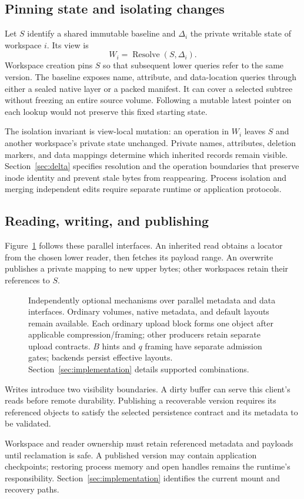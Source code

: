 \subsection{Pinning state and isolating changes}

Let $S$ identify a shared immutable baseline and $\Delta_i$ the private
writable state of workspace $i$. Its view is
\begin{equation}
  W_i = \operatorname{Resolve}(S,\Delta_i).
\end{equation}
Workspace creation pins $S$ so that subsequent lower queries refer to the
same version. The baseline exposes name, attribute, and data-location
queries through either a sealed native layer or a packed manifest.
It can cover a selected subtree without freezing an entire source volume.
Following a mutable latest pointer on each lookup would not preserve
this fixed starting state.

The isolation invariant is view-local mutation: an operation in $W_i$
leaves $S$ and another workspace's private state unchanged. Private names,
attributes, deletion markers, and data mappings determine which inherited
records remain visible. Section~\ref{sec:delta} specifies resolution and
the operation boundaries that preserve inode identity and prevent stale
bytes from reappearing. Process isolation and merging independent edits
require separate runtime or application protocols.

\subsection{Reading, writing, and publishing}

Figure~\ref{fig:overview} follows these parallel interfaces. An inherited
read obtains a locator from the chosen lower reader, then fetches its
payload range. An overwrite publishes a private mapping to new upper
bytes; other workspaces retain their references to $S$.

\begin{figure}[!t]
\centering

\caption{Independently optional mechanisms over parallel metadata and data
interfaces. Ordinary volumes, native metadata, and default layouts remain
available. Each ordinary upload block forms one object after applicable
compression/framing; other producers retain separate upload contracts.
$B$ hints and $q$ framing have separate admission gates; backends persist
effective layouts. Section~\ref{sec:implementation} details supported combinations.}
\label{fig:overview}
\end{figure}

Writes introduce two visibility boundaries. A dirty buffer can serve
this client's reads before remote durability. Publishing a recoverable
version requires its referenced objects to satisfy the selected
persistence contract and its metadata to be validated.

Workspace and reader ownership must retain referenced metadata and
payloads until reclamation is safe. A published version may contain
application checkpoints; restoring process memory and open handles
remains the runtime's responsibility. Section~\ref{sec:implementation}
identifies the current mount and recovery paths.
